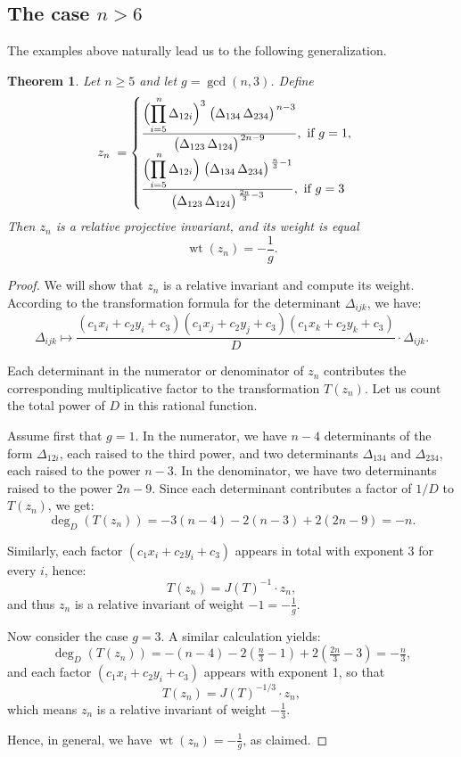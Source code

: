 \documentclass[12pt,reqno]{amsart}
\newtheorem{theorem}{Theorem}
\begin{document}
\subsection{The case $n>6$} The examples above naturally lead us to the following generalization.
\begin{theorem}
\label{thm:zn-general}
Let $n\ge5$ and let  $g=\gcd(n,3)$.  
Define
$$
z_n\;=\begin{cases}
\frac{\displaystyle
      \Bigl(\prod_{i=5}^{\,n} \Delta_{12i}\Bigr)^{3}\;
      \bigl(\Delta_{134}\,\Delta_{234}\bigr)^{\,n-3}}
     {\displaystyle
      \bigl(\Delta_{123}\,\Delta_{124}\bigr)^{\,2n-9}}, \text{ if  } g=1,\\
			\frac{\displaystyle
      \Bigl(\prod_{i=5}^{\,n} \Delta_{12i}\Bigr)\;
      \bigl(\Delta_{134}\,\Delta_{234}\bigr)^{\,\frac{n}{3}-1}}
     {\displaystyle
      \bigl(\Delta_{123}\,\Delta_{124}\bigr)^{\,\frac{2n}{3}-3}},   \text{  if  } g=3\\
			\end{cases}
$$
Then \( z_n \) is a relative projective invariant, and its weight is equal
$$
\operatorname{wt}(z_n)=-\frac{1}{g}.
$$
\end{theorem}


	\begin{proof}
We will show that \( z_n \) is a relative invariant and compute its weight.  
According to the transformation formula for the determinant \( \Delta_{ijk} \), we have:
\[
\Delta_{ijk} \mapsto
\frac{(c_1x_i + c_2y_i + c_3)(c_1x_j + c_2y_j + c_3)(c_1x_k + c_2y_k + c_3)}{D}
\cdot \Delta_{ijk}.
\]

Each determinant in the numerator or denominator of \( z_n \) contributes the corresponding multiplicative factor to the transformation \( T(z_n) \). Let us count the total power of \( D \) in this rational function.

Assume first that \( g = 1 \). In the numerator, we have \( n - 4 \) determinants of the form \( \Delta_{12i} \), each raised to the third power, and two determinants \( \Delta_{134} \) and \( \Delta_{234} \), each raised to the power \( n - 3 \). In the denominator, we have two determinants raised to the power \( 2n - 9 \). Since each determinant contributes a factor of \( 1/D \) to \( T(z_n) \), we get:
\[
\operatorname{deg}_D(T(z_n)) = -3(n - 4) - 2(n - 3) + 2(2n - 9) = -n.
\]

Similarly, each factor \( (c_1x_i + c_2y_i + c_3) \) appears in total with exponent 3 for every \( i \), hence:
\[
T(z_n) = J(T)^{-1} \cdot z_n,
\]
and thus \( z_n \) is a relative invariant of weight \( -1 = -\tfrac{1}{g} \).

Now consider the case \( g = 3 \). A similar calculation yields:
\[
\operatorname{deg}_D(T(z_n)) = -(n - 4) - 2\left(\tfrac{n}{3} - 1\right) + 2\left(\tfrac{2n}{3} - 3\right) = -\tfrac{n}{3},
\]
and each factor \( (c_1x_i + c_2y_i + c_3) \) appears with exponent 1, so that
\[
T(z_n) = J(T)^{-1/3} \cdot z_n,
\]
which means \( z_n \) is a relative invariant of weight \( -\tfrac{1}{3} \).

Hence, in general, we have \( \operatorname{wt}(z_n) = -\tfrac{1}{g} \),
as claimed.
\end{proof}
\end{document}
